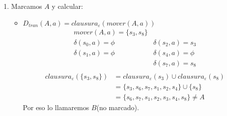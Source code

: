 \begin{enumerate}
\item Marcamos $A$ y calcular:
	\begin{itemize}
	\item $D_{tran} (A,a)=clausura_\varepsilon(mover(A,a))$
	\begin{align*}
mover(A,a)=\{s_3,s_8\}	&	\\
\delta(s_0,a)=\phi \qquad &\delta(s_2,a)=s_3	\\
\delta(s_1,a)=\phi 	\qquad &\delta(s_4,a)=\phi	\\
							&\delta(s_7,a)=s_8	\\
	\end{align*}
	\begin{align*}
clausura_\varepsilon(\{s_3,s_8\})&=clausura_\varepsilon(s_3)\cup clausura_\varepsilon(s_8)	\\
				&=\{s_3,s_6,s_7,s_1,s_2,s_4\}\cup \{s_8\}	\\
				&=\{s_6,s_7,s_1,s_2,s_3,s_4,s_8\}\not = A
	\end{align*}
	Por eso lo llamaremos $B$(no marcado).


\end{itemize}
\end{enumerate}
